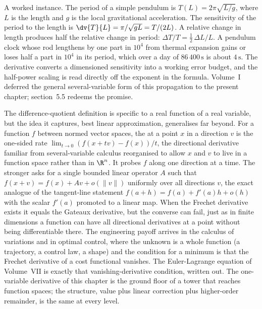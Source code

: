 A worked instance. The period of a simple pendulum is $T(L) =
2\pi \sqrt{L/g}$, where $L$ is the length and $g$ is the local
gravitational acceleration. The sensitivity of the period to the
length is $\dv{T}{L} = \pi / \sqrt{g L} = T / (2 L)$. A relative
change in length produces half the relative change in period:
$\Delta T / T = \tfrac{1}{2} \, \Delta L / L$. A pendulum clock
whose rod lengthens by one part in $10^{4}$ from thermal expansion
gains or loses half a part in $10^{4}$ in its period, which over a
day of $86\,400 \,\si{\second}$ is about $4 \,\si{\second}$. The
derivative converts a dimensioned sensitivity into a working error
budget, and the half-power scaling is read directly off the
exponent in the formula. Volume~I deferred the general
several-variable form of this propagation to the present chapter;
section~5.5 redeems the promise.

\begin{mastery}
The difference-quotient definition is specific to a real function
of a real variable, but the idea it captures, best linear
approximation, generalises far beyond. For a function $f$ between
normed vector spaces, the  at a point
$x$ in a direction $v$ is the one-sided rate $\lim_{t \to 0}
(f(x + tv) - f(x))/t$, the directional derivative familiar from
several-variable calculus reorganised to allow $x$ and $v$ to live
in a function space rather than in $\R^{n}$. It probes $f$ along one
direction at a time. The stronger 
asks for a single bounded linear operator $A$ such that $f(x + v) =
f(x) + A v + o(\lVert v \rVert)$ uniformly over all directions $v$,
the exact analogue of the tangent-line statement $f(a + h) = f(a) +
f'(a) h + o(h)$ with the scalar $f'(a)$ promoted to a linear map.
When the Frechet derivative exists it equals the Gateaux derivative,
but the converse can fail, just as in finite dimensions a function
can have all directional derivatives at a point without being
differentiable there. The engineering payoff arrives in the
calculus of variations and in optimal control, where the
unknown is a whole function (a trajectory, a control law, a shape)
and the condition for a minimum is that the Frechet derivative of a
cost functional vanishes. The Euler-Lagrange equation of Volume~VII
is exactly that vanishing-derivative condition, written out. The
one-variable derivative of this chapter is the ground floor of a
tower that reaches function spaces; the structure, value plus
linear correction plus higher-order remainder, is the same at every
level.
\end{mastery}

